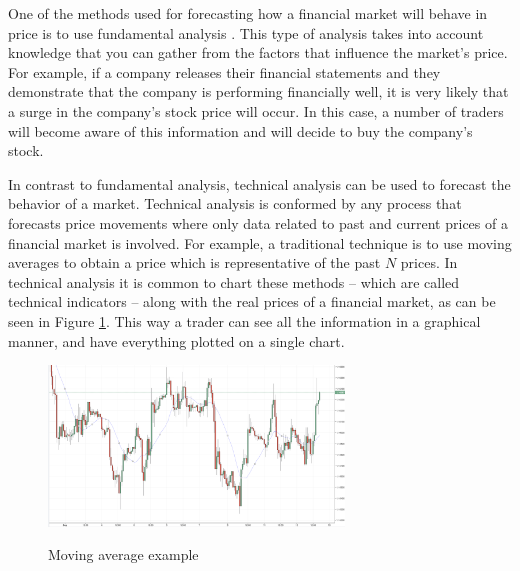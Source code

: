 One of the methods used for forecasting how a financial market will behave in
price is to use fundamental analysis \cite{Kadiri2015}. This type of analysis takes into %
account knowledge that you can gather from the factors that influence the %
market's price. For example, if a company releases their financial statements
and they demonstrate that the company is performing financially well, it is very
likely that a surge in the company's stock price will occur. In this case, a
number of traders will become aware of this information and will decide to buy
the company's stock.

In contrast to fundamental analysis, technical analysis can be used to forecast
the behavior of a market. Technical analysis is conformed by any process that
forecasts price movements where only data related to past and current prices of
a financial market is involved. For example, a traditional technique is to use
moving averages to obtain a price which is representative of the past $N$
prices. In technical analysis it is common to chart these methods -- which are
called technical indicators -- along with the real prices of a financial market,
as can be seen in Figure \ref{figure:moving-average-example}. This way a trader
can see all the information in a graphical manner, and have everything plotted
on a single chart.

\begin{figure}
  \caption{Moving average example} \centering
  \includegraphics[width=0.7\textwidth]{img/moving-average.png}
  \label{figure:moving-average-example}
\end{figure}

